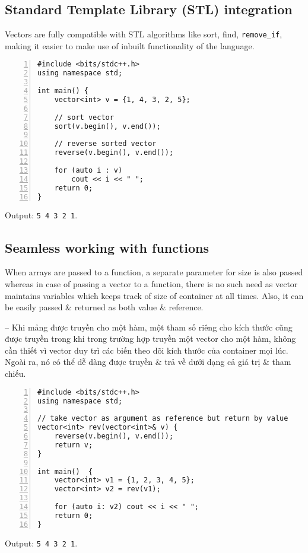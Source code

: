 \documentclass{article}
\begin{document}

\subsection{Standard Template Library (STL) integration}
Vectors are fully compatible with STL algorithms like sort, find, \verb|remove_if|, making it easier to make use of inbuilt functionality of the language.
\begin{Verbatim}[numbers=left,xleftmargin=5mm]
#include <bits/stdc++.h>
using namespace std;

int main() {
    vector<int> v = {1, 4, 3, 2, 5};
	
    // sort vector
    sort(v.begin(), v.end());
	
    // reverse sorted vector
    reverse(v.begin(), v.end());
	
    for (auto i : v)
        cout << i << " ";
    return 0;
}
\end{Verbatim}
Output: {\tt5 4 3 2 1}.


\subsection{Seamless working with functions}
When arrays are passed to a function, a separate parameter for size is also passed whereas in case of passing a vector to a function, there is no such need as vector maintains variables which keeps track of size of container at all times. Also, it can be easily passed \& returned as both value \& reference.

-- Khi mảng được truyền cho một hàm, một tham số riêng cho kích thước cũng được truyền trong khi trong trường hợp truyền một vector cho một hàm, không cần thiết vì vector duy trì các biến theo dõi kích thước của container mọi lúc. Ngoài ra, nó có thể dễ dàng được truyền \& trả về dưới dạng cả giá trị \& tham chiếu.
\begin{Verbatim}[numbers=left,xleftmargin=5mm]
#include <bits/stdc++.h> 
using namespace std;

// take vector as argument as reference but return by value
vector<int> rev(vector<int>& v) {
    reverse(v.begin(), v.end());
    return v;
}

int main()  { 
    vector<int> v1 = {1, 2, 3, 4, 5};
    vector<int> v2 = rev(v1);
    
    for (auto i: v2) cout << i << " ";
    return 0; 
}
\end{Verbatim}
Output: {\tt5 4 3 2 1}.
\end{document}
